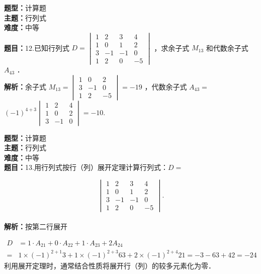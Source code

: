 \documentclass{ctexart}
\newenvironment{question}[5]{%
	\noindent\textbf{题型：}#1\\
	\textbf{主题：}#2\\
	\textbf{难度：}#3\\
	\textbf{题目：}#4\\
	\textbf{解析：}#5\\
	\vspace{1em}
}{}
\begin{document}
	\begin{question}
		{计算题}
		{行列式}
		{中等}
		{12.已知行列式 $D=\begin{vmatrix}1 & 2 & 3 & 4 \\ 1 & 0 & 1 & 2 \\ 3 & -1 & -1 & 0 \\ 1 & 2 & 0 & -5\end{vmatrix}$ ，求余子式 $M_{13}$ 和代数余子式 $A_{43}$ ．}
		{余子式 $M_{13}=\begin{vmatrix}1 & 0 & 2 \\ 3 & -1 & 0 \\ 1 & 2 & -5\end{vmatrix}=-19$ ，代数余子式 $A_{43}=$ $(-1)^{4+3}\begin{vmatrix}1 & 2 & 4 \\ 1 & 0 & 2 \\ 3 & -1 & 0\end{vmatrix}=-10$.}
	\end{question}
	
	
	
	\begin{question}
		{计算题}
		{行列式}
		{中等}
		{13.用行列式按行（列）展开定理计算行列式：$D=$
			
			$$
			\begin{vmatrix}
				1 & 2 & 3 & 4 \\
				1 & 0 & 1 & 2 \\
				3 & -1 & -1 & 0 \\
				1 & 2 & 0 & -5
			\end{vmatrix} .
			$$}
		{按第二行展开
			
			$$
			\begin{aligned}
				D & =1 \cdot A_{21}+0 \cdot A_{22}+1 \cdot A_{23}+2 A_{24} \\
				= & 1 \times(-1)^{2+1} 3+1 \times(-1)^{2+3} 63+2 \times(-1)^{2+4} 21=-3-63+42=-24
			\end{aligned}
			$$
			利用展开定理时，通常结合性质将展开行（列）的较多元素化为零．}
	\end{question}
	
\end{document}
